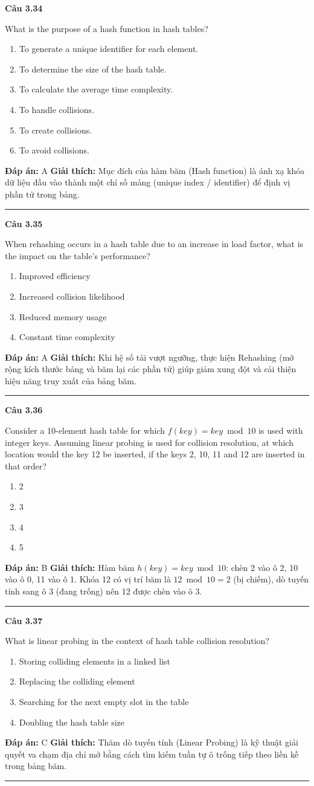 \documentclass[11pt,a4paper]{article}
\newenvironment{question}[1]{%
  \par\vspace{1em}\noindent\textbf{\large Câu #1}\par\vspace{0.4em}
}{%
  \par\vspace{1em}\hrule\vspace{0.6em}
}
\newenvironment{choices}{%
  \begin{enumerate}[label=\textbf{\Alph*.},leftmargin=2.2em,itemsep=2pt,topsep=3pt]
}{%
  \end{enumerate}
}
\newcommand{\choice}{\item}
\begin{document}
\begin{question}{3.34}
What is the purpose of a hash function in hash tables?
\begin{choices}
\choice To generate a unique identifier for each element.
\choice To determine the size of the hash table.
\choice To calculate the average time complexity.
\choice To handle collisions.
\choice To create collisions.
\choice To avoid collisions.
\end{choices}
\textbf{Đáp án:} A
\textbf{Giải thích:} Mục đích của hàm băm (Hash function) là ánh xạ khóa dữ liệu đầu vào thành một chỉ số mảng (unique index / identifier) để định vị phần tử trong bảng.
\end{question}

\begin{question}{3.35}
When rehashing occurs in a hash table due to an increase in load factor, what is the impact on the table's performance?
\begin{choices}
\choice Improved efficiency
\choice Increased collision likelihood
\choice Reduced memory usage
\choice Constant time complexity
\end{choices}
\textbf{Đáp án:} A
\textbf{Giải thích:} Khi hệ số tải vượt ngưỡng, thực hiện Rehashing (mở rộng kích thước bảng và băm lại các phần tử) giúp giảm xung đột và cải thiện hiệu năng truy xuất của bảng băm.
\end{question}

\begin{question}{3.36}
Consider a 10-element hash table for which $f(key) = key \bmod 10$ is used with integer keys. Assuming linear probing is used for collision resolution, at which location would the key 12 be inserted, if the keys 2, 10, 11 and 12 are inserted in that order?
\begin{choices}
\choice 2
\choice 3
\choice 4
\choice 5
\end{choices}
\textbf{Đáp án:} B
\textbf{Giải thích:} Hàm băm $h(key) = key \bmod 10$: chèn 2 vào ô 2, 10 vào ô 0, 11 vào ô 1. Khóa 12 có vị trí băm là $12 \bmod 10 = 2$ (bị chiếm), dò tuyến tính sang ô 3 (đang trống) nên 12 được chèn vào ô 3.
\end{question}

\begin{question}{3.37}
What is linear probing in the context of hash table collision resolution?
\begin{choices}
\choice Storing colliding elements in a linked list
\choice Replacing the colliding element
\choice Searching for the next empty slot in the table
\choice Doubling the hash table size
\end{choices}
\textbf{Đáp án:} C
\textbf{Giải thích:} Thăm dò tuyến tính (Linear Probing) là kỹ thuật giải quyết va chạm địa chỉ mở bằng cách tìm kiếm tuần tự ô trống tiếp theo liền kề trong bảng băm.
\end{question}
\end{document}
